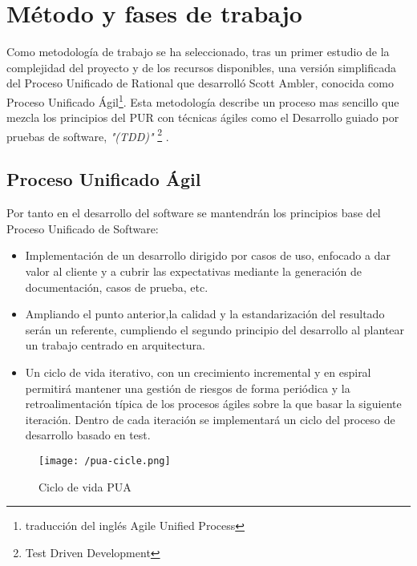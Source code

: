 \chapter{Método y fases de trabajo}

Como metodología de trabajo se ha seleccionado, tras un primer estudio de la complejidad del proyecto y
de los recursos disponibles, una versión simplificada del Proceso Unificado de Rational \cite{Ambler2002} que desarrolló Scott Ambler, 
conocida como Proceso Unificado Ágil\footnote{traducción del inglés Agile Unified Process}. Esta metodología describe un proceso mas sencillo que
mezcla los principios del PUR con técnicas ágiles como el Desarrollo guiado por pruebas de software, \textit{"(TDD)"} \footnote{Test Driven Development } \cite{Beck2003}.

\section{Proceso Unificado Ágil}
Por tanto en el desarrollo del software se mantendrán los principios base del Proceso Unificado de Software: 
\begin{itemize}
\item Implementación de un desarrollo dirigido por casos de uso, enfocado a dar valor al cliente y a cubrir
las expectativas mediante la generación de documentación, casos de prueba, etc. 

\item Ampliando el punto anterior,la calidad y la estandarización del resultado serán un referente, 
cumpliendo el segundo principio del desarrollo al plantear un trabajo centrado en arquitectura.

\item Un ciclo de vida iterativo, con un crecimiento incremental y en espiral permitirá mantener una gestión de riesgos
de forma periódica y la retroalimentación típica de los procesos ágiles sobre la que basar la siguiente iteración. 
Dentro de cada iteración se implementará un ciclo del proceso de desarrollo basado en test.
\end{itemize}

\begin{figure}[!h]
\begin{center}
\texttt{[image: /pua-cicle.png]}
\caption{Ciclo de vida PUA}
\label{fig:ciclo-pua}
\end{center}
\end{figure}

